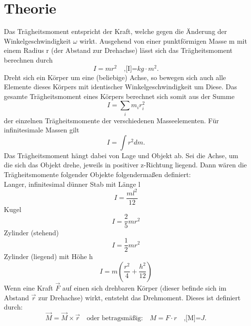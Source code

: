 \section{Theorie}
\label{sec:Theorie}

Das Trägheitsmoment entspricht der Kraft, welche gegen die Änderung der
Winkelgeschwindigkeit $\omega$ wirkt. Ausgehend von einer punktförmigen 
Masse m mit einem Radius r (der Abstand zur Drehachse) lässt sich das 
Trägheitsmoment berechnen durch
\begin{equation}
    I = m r^2 \quad \text{,[I]=} kg \cdot m^2.
    \label{eq:gl1}
\end{equation}
\noindent Dreht sich ein Körper um eine (beliebige) Achse, so bewegen sich auch alle
Elemente dieses Körpers mit identischer Winkelgeschwindigkeit um Diese. Das
gesamte Trägheitsmoment eines Körpers berechnet sich somit aus der Summe
\begin{equation}
    I = \sum\limits_{i} m_i r_i^2
    \label{eq:gl2}
\end{equation}
\noindent der einzelnen Trägheitsmomente der verschiedenen Masseelementen. Für
infinitesimale Massen gilt
\begin{equation}
    I = \int r^2 dm .
    \label{eqn:gl3}
\end{equation}
\noindent Das Trägheitsmoment hängt dabei von Lage und Objekt ab. Sei die
Achse, um die sich das Objekt drehe, jeweils in positiver z-Richtung liegend.
Dann wären die Trägheitsmomente folgender Objekte folgendermaßen definiert:\\
\noindent Langer, infinitesimal dünner Stab mit Länge l
\begin{equation}
    I = \frac{ml^2}{12}
    \label{eqn:gl4}
\end{equation}
Kugel
\begin{equation}
    I = \frac{2}{5} m r^2
    \label{eq:gl5}
\end{equation}
Zylinder (stehend)
\begin{equation}
    I = \frac{1}{2} m r^2
    \label{eq:gl6}
\end{equation}
Zylinder (liegend) mit Höhe h
\begin{equation}
    I = m \left(\frac{r^2}{4} + \frac{h^2}{12} \right) 
    \label{eq:gl7}
\end{equation}
Wenn eine Kraft $\vec{F}$ auf einen sich drehbaren Körper (dieser befinde
sich im Abstand $\vec{r}$ zur Drehachse) wirkt, entsteht das Drehmoment.
Dieses ist definiert durch:
\begin{equation}
    \vec{M} = \vec{M} \times \vec{r} \quad \text{oder betragsmäßig:} 
    \quad M = F \cdot r \quad \text{,[M]=} J.\end{equation}
